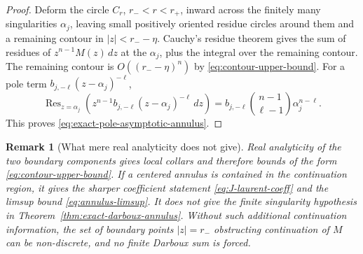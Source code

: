 \documentclass[11pt]{article}
\newtheorem{remark}[theorem]{Remark}
\newcommand{\dd}{\,d}
\newcommand{\1}{\mathbf 1}
\begin{document}
\begin{proof}
Deform the circle \(C_r\), \(r_-<r<r_+\), inward across the finitely many singularities
\(\alpha_j\), leaving small positively oriented residue circles around them and a remaining
contour in \(|z|<r_- -\eta\). Cauchy's residue theorem gives the sum of residues of
\(z^{n-1}M(z)\dd z\) at the \(\alpha_j\), plus the integral over the remaining contour. The
remaining contour is \(O((r_- -\eta)^n)\) by \eqref{eq:contour-upper-bound}. For a pole term
\(b_{j,-\ell}(z-\alpha_j)^{-\ell}\),
\[
  \operatorname{Res}_{z=\alpha_j}\left(z^{n-1}b_{j,-\ell}(z-\alpha_j)^{-\ell}\dd z\right)
  =b_{j,-\ell}\binom{n-1}{\ell-1}\alpha_j^{n-\ell}.
\]
This proves \eqref{eq:exact-pole-asymptotic-annulus}.
\end{proof}

\begin{remark}[What mere real analyticity does not give]
Real analyticity of the two boundary components gives local collars and therefore bounds of
the form \eqref{eq:contour-upper-bound}. If a centered annulus is contained in the
continuation region, it gives the sharper coefficient statement
\eqref{eq:J-laurent-coeff} and the limsup bound \eqref{eq:annulus-limsup}. It does not give
the finite singularity hypothesis in Theorem~\ref{thm:exact-darboux-annulus}. Without such
additional continuation information, the set of boundary points \(|z|=r_-\) obstructing
continuation of \(M\) can be non-discrete, and no finite Darboux sum is forced.
\end{remark}
\end{document}

